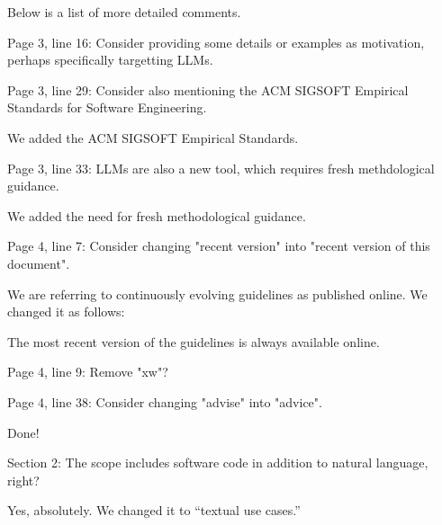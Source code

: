\documentclass[12pt,english]{reviewresponse}
\begin{document}
\begin{revcomment}
    Below is a list of more detailed comments.

Page 3, line 16: Consider providing some details or examples as motivation, perhaps specifically targetting LLMs.
\end{revcomment}
\begin{revresponse}
\end{revresponse}

\begin{revcomment}
Page 3, line 29: Consider also mentioning the  ACM SIGSOFT Empirical Standards for Software Engineering.
\end{revcomment}
\begin{revresponse}
    We added the ACM SIGSOFT Empirical Standards.
\end{revresponse}

\begin{revcomment}
Page 3, line 33: LLMs are also a new tool, which requires fresh methdological guidance.
\end{revcomment}
\begin{revresponse}
    We added the need for fresh methodological guidance.
\end{revresponse}

\begin{revcomment}
Page 4, line 7: Consider changing "recent version" into "recent version of this document".
\end{revcomment}
\begin{revresponse}
We are referring to continuously evolving guidelines as published online. We changed it as follows:
	\begin{changes}
		The most recent version of the guidelines is always available online.
	\end{changes}
    
\end{revresponse}

\begin{revcomment}
Page 4, line 9: Remove "xw"?


Page 4, line 38: Consider changing "advise" into "advice".
\end{revcomment}
\begin{revresponse}
    Done!
\end{revresponse}

\begin{revcomment}
Section 2: The scope includes software code in addition to natural language, right?
\end{revcomment}
\begin{revresponse}
    Yes, absolutely. We changed it to ``textual use cases.''
\end{revresponse}
\end{document}
